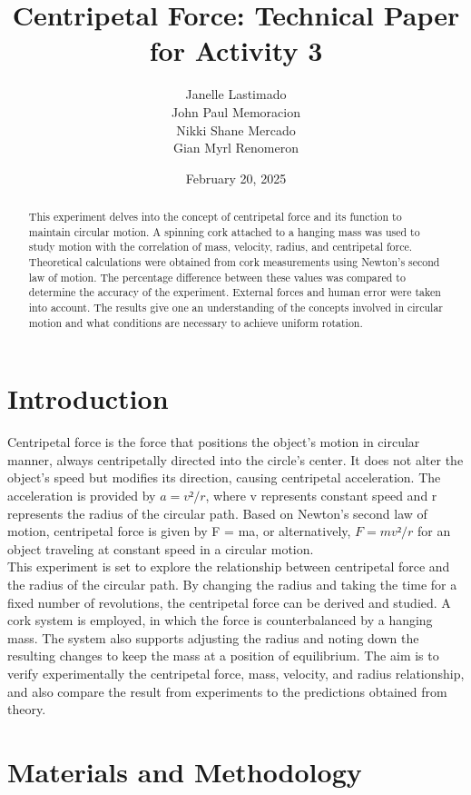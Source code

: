 \documentclass[a4paper,12pt]{article}
\title{Centripetal Force: Technical Paper for Activity 3}
\author{Janelle Lastimado \\
John Paul Memoracion \\ 
Nikki Shane Mercado \\
Gian Myrl Renomeron}
\date{February 20, 2025}
\begin{document}
\maketitle

\begin{abstract}
    This experiment delves into the concept of centripetal force and its function to maintain circular motion. A spinning cork attached to a hanging mass was used to study motion with the correlation of mass, velocity, radius, and centripetal force. Theoretical calculations were obtained from cork measurements using Newton's second law of motion. The percentage difference between these values was compared to determine the accuracy of the experiment. External forces and human error were taken into account. The results give one an understanding of the concepts involved in circular motion and what conditions are necessary to achieve uniform rotation.
\end{abstract}

\section{Introduction}
Centripetal force is the force that positions the object's motion in circular manner, always centripetally directed into the circle's center. It does not alter the object's speed but modifies its direction, causing centripetal acceleration.\cite{LucasGhose2024} The acceleration is provided by \(a = v² / r \), where v represents constant speed and r represents the radius of the circular path. Based on Newton's second law of motion, centripetal force is given by F = ma, or alternatively, \( F = mv² / r\) for an object traveling at constant speed in a circular motion.\cite{CentripetalForce}\\

This experiment is set to explore the relationship between centripetal force and the radius of the circular path. By changing the radius and taking the time for a fixed number of revolutions, the centripetal force can be derived and studied. A cork system is employed, in which the force is counterbalanced by a hanging mass. The system also supports adjusting the radius and noting down the resulting changes to keep the mass at a position of equilibrium. The aim is to verify experimentally the centripetal force, mass, velocity, and radius relationship, and also compare the result from experiments to the predictions obtained from theory.
\section{Materials and Methodology}
\end{document}
